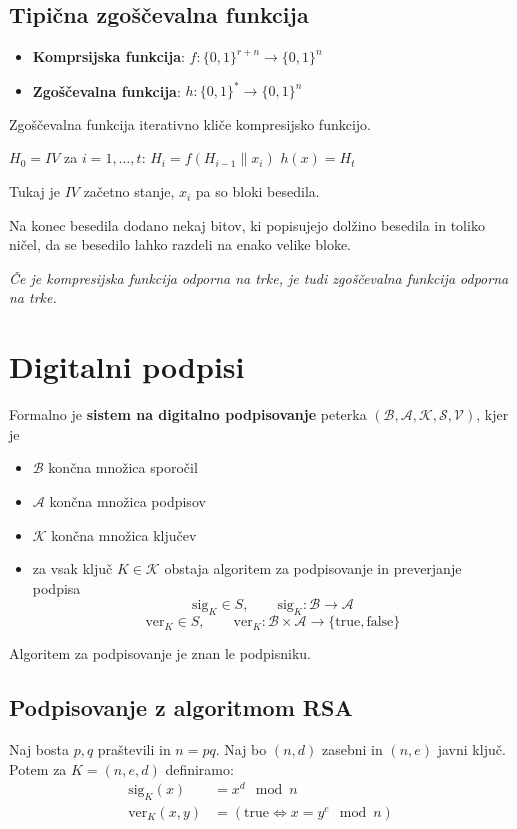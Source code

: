 \begin{multicols}{5}
\subsection*{Tipična zgoščevalna funkcija}
\begin{itemize}
	\item \textbf{Komprsijska funkcija}: $f: \{0,1\}^{r+n} \to \{0,1\}^n$
	\item \textbf{Zgoščevalna funkcija}: $h: \{0,1\}^* \to \{0,1\}^n$
\end{itemize}

Zgoščevalna funkcija iterativno kliče kompresijsko funkcijo.

\begin{koda}
$H_0 = IV$
za $i = 1, \dots, t$:
	$H_i = f(H_{i-1} \| x_i)$
$h(x) = H_t$
\end{koda}

Tukaj je $IV$ začetno stanje, $x_i$ pa so bloki besedila.

Na konec besedila dodano nekaj bitov, ki popisujejo dolžino besedila in toliko ničel, da se besedilo lahko razdeli na enako velike bloke.

\textit{Če je kompresijska funkcija odporna na trke, je tudi zgoščevalna funkcija odporna na trke.}


\section*{Digitalni podpisi}
Formalno je \textbf{sistem na digitalno podpisovanje} peterka $(\mathcal{B}, \mathcal{A}, \mathcal{K}, \mathcal{S}, \mathcal{V})$, kjer je
\begin{itemize}
	\item $\mathcal{B}$ končna množica sporočil
	\item $\mathcal{A}$ končna množica podpisov
	\item $\mathcal{K}$ končna množica ključev
	\item za vsak ključ $K \in \mathcal{K}$ obstaja algoritem za podpisovanje in preverjanje podpisa
	\[ \text{sig}_K \in S, \qquad \text{sig}_K : \mathcal{B} \to \mathcal{A} \]
	\[ \text{ver}_K \in S, \qquad \text{ver}_K : \mathcal{B} \times \mathcal{A} \to \{\text{true}, \text{false}\} \]
\end{itemize}
Algoritem za podpisovanje je znan le podpisniku.

\subsection*{Podpisovanje z algoritmom RSA}
Naj bosta $p, q$ praštevili in $n = pq$. Naj bo $(n, d)$ zasebni in $(n, e)$ javni ključ.
Potem za $K = (n, e, d)$ definiramo:
\begin{align*}
\text{sig}_K(x) &= x^d \mod n \\
\text{ver}_K(x,y) &= \left( \text{true} \iff x = y^e \mod n \right)
\end{align*}


\end{multicols}
